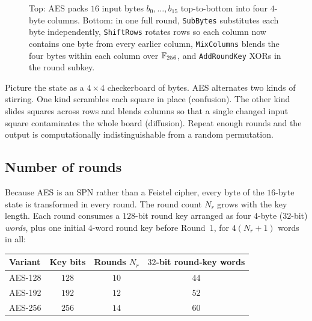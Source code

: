\begin{figure}[htbp]
\caption{Top: AES packs $16$ input bytes $b_0,\dots,b_{15}$ top-to-bottom into four $4$-byte columns. Bottom: in one full round, \texttt{SubBytes} substitutes each byte independently, \texttt{ShiftRows} rotates rows so each column now contains one byte from every earlier column, \texttt{MixColumns} blends the four bytes within each column over $\mathbb{F}_{256}$, and \texttt{AddRoundKey} XORs in the round subkey.}
\label{ch12:fig-aes-state-pipeline}
\end{figure}

\begin{intuitionbox}
Picture the state as a $4\times4$ checkerboard of bytes. AES alternates two kinds
of stirring. One kind scrambles each square in place (confusion). The other kind
slides squares across rows and blends columns so that a single changed input square
contaminates the whole board (diffusion). Repeat enough rounds and the output is
computationally indistinguishable from a random permutation.
\end{intuitionbox}

\subsection{Number of rounds}

Because AES is an SPN rather than a Feistel cipher, every byte of the $16$-byte
state is transformed in every round. The round count $N_r$ grows with the key
length. Each round consumes a $128$-bit round key arranged as four $4$-byte
($32$-bit) \emph{words}, plus one initial $4$-word round key before Round~$1$,
for $4(N_r + 1)$ words in all:

\begin{center}
\begin{tabular}{lccc}
\toprule
Variant & Key bits & Rounds $N_r$ & $32$-bit round-key words \\
\midrule
AES-128 & $128$ & $10$ & $44$ \\
AES-192 & $192$ & $12$ & $52$ \\
AES-256 & $256$ & $14$ & $60$ \\
\bottomrule
\end{tabular}
\end{center}

